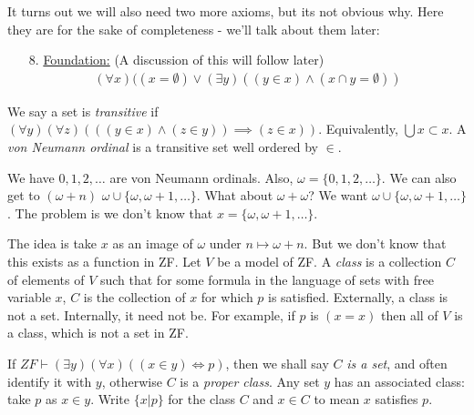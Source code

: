 \documentclass[10pt,a4paper]{article}
\begin{document}
It turns out we will also need two more axioms, but its not obvious why. Here they are for the sake of completeness - we'll talk about them later:
\begin{itemize}
\item[8.] \underline{Foundation:} (A discussion of this will follow later)
\begin{align*}
(\forall x)((x = \emptyset)\vee (\exists y)((y \in x)\wedge (x \cap y = \emptyset))\tag{Fdn}
\end{align*}
\end{itemize}
We say a set is \emph{transitive} if $(\forall y)(\forall z)(((y \in x)\wedge(z \in y))\implies (z \in x))$. Equivalently, $\bigcup x \subset x$. A \emph{von Neumann ordinal} is a transitive set well ordered by $\in$.

We have $0,1,2,\ldots$ are von Neumann ordinals. Also, $\omega = \{0,1,2,\ldots\}$. We can also get to $(\omega + n)$ $\omega \cup\{\omega, \omega+1, \ldots\}$. What about $\omega + \omega$? We want $\omega \cup\{\omega, \omega+1, \ldots\}$. The problem is we don't know that $x = \{\omega, \omega+1, \ldots\}$.

The idea is take $x$ as an image of $\omega$ under $n \mapsto \omega + n$. But we don't know that this exists as a function in ZF. Let $V$ be a model of ZF. A \emph{class} is a collection $C$ of elements of $V$ such that for some formula in the language of sets with free variable $x$, $C$ is the collection of $x$ for which $p$ is satisfied. Externally, a class is not a set. Internally, it need not be. For example, if $p$ is $(x=x)$ then all of $V$ is a class, which is not a set in ZF.

If $ZF \vdash (\exists y)(\forall x)((x \in y) \iff p)$, then we shall say $C$ \emph{is a set}, and often identify it with $y$, otherwise $C$ is a \emph{proper class}. Any set $y$ has an associated class: take $p$ as $x \in y$. Write $\{x |p\}$ for the class $C$ and $x \in C$ to mean $x$ satisfies $p$. 
\end{document}
